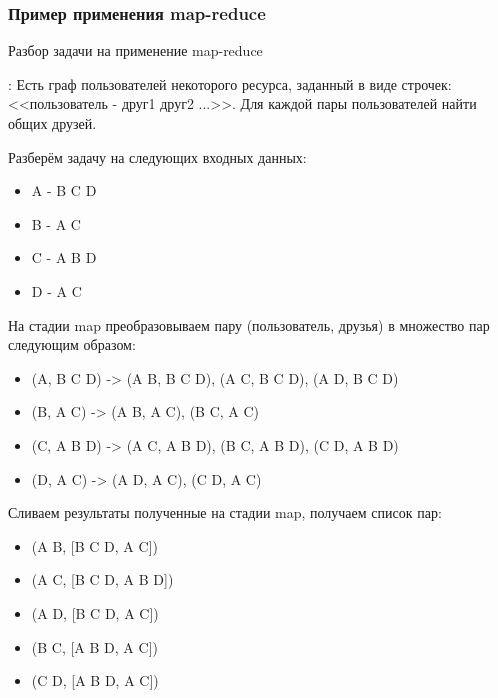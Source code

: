 \documentclass[12pt,a4paper,oneside]{extarticle}
\begin{document}
        \subsubsection{Пример применения map-reduce}

            Разбор задачи на применение map-reduce

            {:} Есть граф пользователей некоторого ресурса, заданный в виде строчек: <<пользователь - друг1 друг2 ...>>. Для каждой пары пользователей найти общих друзей.

            Разберём задачу на следующих входных данных: \\
                \begin{itemize}
                    \item A - B C D
                    \item B - A C
                    \item C - A B D
                    \item D - A C
                \end{itemize}          

            На стадии map преобразовываем пару (пользователь, друзья) в множество пар следующим образом:

            \begin{itemize}
                \item (A, B C D) -> (A B, B C D), (A C, B C D), (A D, B C D)
                \item (B, A C) -> (A B, A C), (B C, A C)
                \item (C, A B D) -> (A C, A B D), (B C, A B D), (C D, A B D)
                \item (D, A C) -> (A D, A C), (C D, A C)
            \end{itemize}

            Сливаем результаты полученные на стадии map, получаем список пар:

            \begin{itemize}
                \item (A B, [B C D, A C])
                \item (A C, [B C D, A B D])
                \item (A D, [B C D, A C])
                \item (B C, [A B D, A C])
                \item (C D, [A B D, A C])
            \end{itemize}
\end{document}
